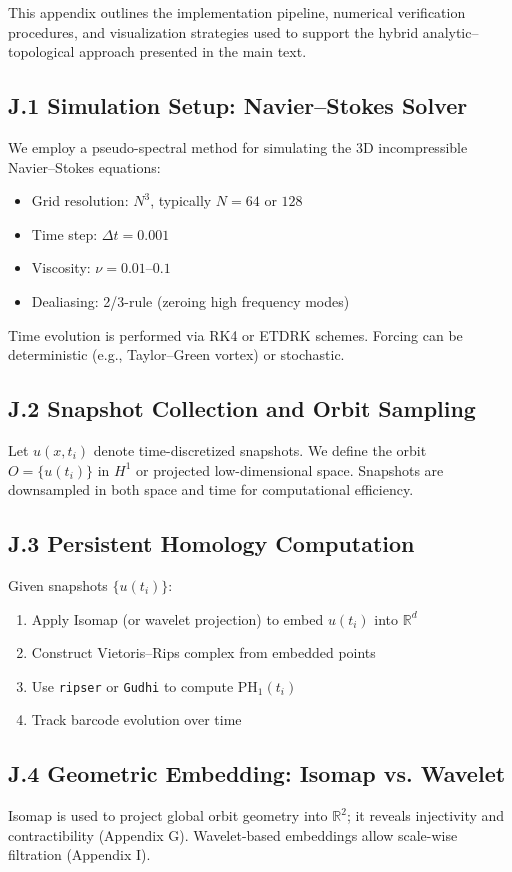 \documentclass[11pt]{article}
\theoremstyle{definition}
\begin{document}
This appendix outlines the implementation pipeline, numerical verification procedures, and visualization strategies used to support the hybrid analytic–topological approach presented in the main text.

\subsection*{J.1 Simulation Setup: Navier--Stokes Solver}
We employ a pseudo-spectral method for simulating the 3D incompressible Navier--Stokes equations:
\begin{itemize}
  \item Grid resolution: $N^3$, typically $N = 64$ or $128$
  \item Time step: $\Delta t = 0.001$
  \item Viscosity: $\nu = 0.01$--$0.1$
  \item Dealiasing: 2/3-rule (zeroing high frequency modes)
\end{itemize}
Time evolution is performed via RK4 or ETDRK schemes. Forcing can be deterministic (e.g., Taylor--Green vortex) or stochastic.

\subsection*{J.2 Snapshot Collection and Orbit Sampling}
Let $u(x,t_i)$ denote time-discretized snapshots. We define the orbit $O = \{u(t_i)\}$ in $H^1$ or projected low-dimensional space. Snapshots are downsampled in both space and time for computational efficiency.

\subsection*{J.3 Persistent Homology Computation}
Given snapshots $\{u(t_i)\}$:
\begin{enumerate}
  \item Apply Isomap (or wavelet projection) to embed $u(t_i)$ into $\mathbb{R}^d$
  \item Construct Vietoris--Rips complex from embedded points
  \item Use \texttt{ripser} or \texttt{Gudhi} to compute $\mathrm{PH}_1(t_i)$
  \item Track barcode evolution over time
\end{enumerate}

\subsection*{J.4 Geometric Embedding: Isomap vs. Wavelet}
Isomap is used to project global orbit geometry into $\mathbb{R}^2$; it reveals injectivity and contractibility (Appendix G). Wavelet-based embeddings allow scale-wise filtration (Appendix I).
\end{document}

